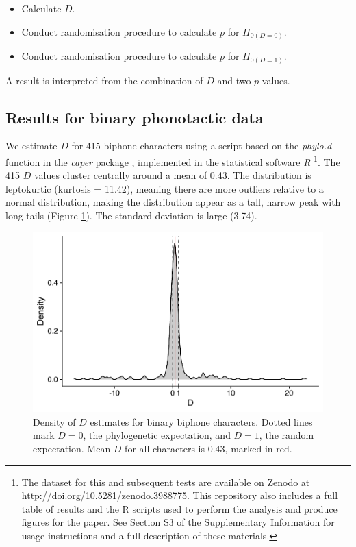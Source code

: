 \begin{itemize}
\tightlist
\item
  Calculate \(D\).
\item
  Conduct randomisation procedure to calculate \(p\) for \(H_{0(D=0)}\).
\item
  Conduct randomisation procedure to calculate \(p\) for \(H_{0(D=1)}\).
\end{itemize}

A result is interpreted from the combination of \(D\) and two \(p\) values.

\hypertarget{phy-sig-bin-results}{%
\subsection{Results for binary phonotactic data}\label{phy-sig-bin-results}}

We estimate \(D\) for 415 biphone characters using a script based on the \emph{phylo.d} function in the \emph{caper} package \autocite{orme_caper:_2013}, implemented in the statistical software \emph{R} \autocite{r_core_team_r:_2017}\footnote{The dataset for this and subsequent tests are available on Zenodo at \url{http://doi.org/10.5281/zenodo.3988775}. This repository also includes a full table of results and the R scripts used to perform the analysis and produce figures for the paper. See Section S3 of the Supplementary Information for usage instructions and a full description of these materials.}. The 415 \(D\) values cluster centrally around a mean of 0.43. The distribution is leptokurtic (kurtosis = 11.42), meaning there are more outliers relative to a normal distribution, making the distribution appear as a tall, narrow peak with long tails (Figure \ref{fig:d-density}). The standard deviation is large (3.74).

\begin{figure}[tbp]

{\centering \includegraphics[width=0.66\linewidth]{05-phylo-signal/fig/d-density} 

}

\caption[Density of $D$ estimates for binary biphone characters]{Density of $D$ estimates for binary biphone characters. Dotted lines mark $D=0$, the phylogenetic expectation, and $D=1$, the random expectation. Mean $D$ for all characters is 0.43, marked in red.}\label{fig:d-density}
\end{figure}

